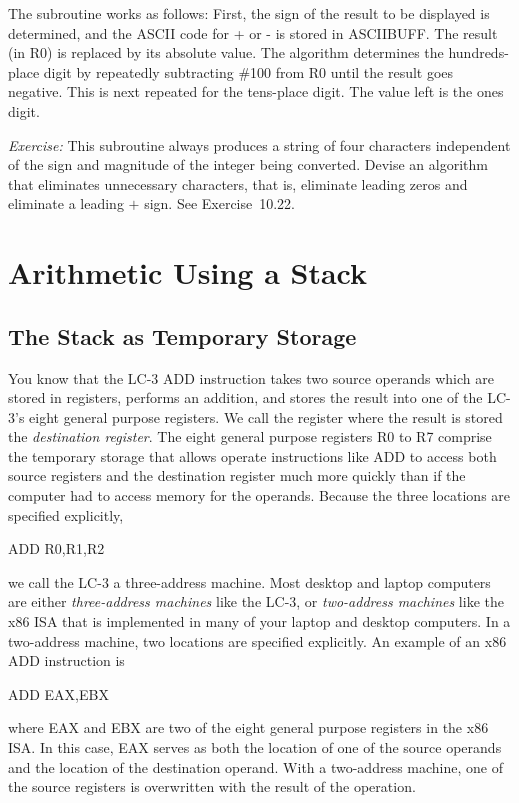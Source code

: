 \documentclass{patt}
\begin{document}
The subroutine works as follows: First, the sign of the result to be displayed
is determined, and the ASCII code for + or - is stored in ASCIIBUFF.  The 
result (in R0) is replaced by its absolute value. The algorithm determines the
hundreds-place digit by repeatedly subtracting \#100 from R0 until the
result goes negative. This is next repeated for the tens-place digit.
The value left is the ones digit.

{\em Exercise:} This subroutine always produces a string of four
characters independent of the sign and magnitude of the integer being
converted. Devise an algorithm that eliminates unnecessary characters,
that is, eliminate leading zeros and eliminate a leading $+$ sign. 
See Exercise~10.22.

\FloatBarrier
\section{Arithmetic Using a Stack}
\label{sec:stack.arithmetic}
\subsection{The Stack as Temporary Storage}

You know that the LC-3 ADD instruction takes two source operands which are
stored in registers, performs an addition, and stores the result into one of 
the LC-3's eight general purpose registers.  We call the register where the 
result is stored the {\em destination register}.  The eight general purpose 
registers R0 to R7 comprise the temporary storage that allows operate 
instructions like ADD to access both source registers and the destination 
register much more quickly than if the computer had to access memory for the 
operands.  Because the three locations are specified explicitly, 

\begin{colorverbatim}
                       ADD  R0,R1,R2
\end{colorverbatim}
\noindent
we call the LC-3 a three-address machine.  Most desktop and laptop computers
are either {\em three-address machines} like the LC-3, or {\em two-address 
machines} like the x86 ISA that is implemented in many of your laptop and 
desktop computers.  In a two-address machine, two locations are specified 
explicitly.  An example of an x86 ADD instruction is  

\begin{colorverbatim}
                       ADD  EAX,EBX
\end{colorverbatim}
\noindent
where EAX and EBX are two of the eight general purpose registers in the x86
ISA.  In this case, EAX serves as both the location of one of the source 
operands and the location of the destination operand.  With a two-address
machine, one of the source registers is overwritten with the result of the
operation.
\end{document}
